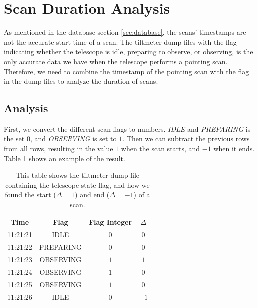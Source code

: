 
\section{Scan Duration Analysis}\label{sec:scan_duration_analysis}
As mentioned in the database section \ref{sec:database}, the scans' timestamps are not the accurate start time of a scan.
The tiltmeter dump files with the flag indicating whether the telescope is idle, preparing to observe, or observing,
is the only accurate data we have when the telescope performs a pointing scan.
Therefore, we need to combine the timestamp of the pointing scan with the flag in the dump files to analyze the duration of scans.

\subsection{Analysis}
First, we convert the different scan flags to numbers.
\textit{IDLE} and \textit{PREPARING} is the set $0$, and \textit{OBSERVING} is set to $1$.
Then we can subtract the previous rows from all rows, resulting in the value $1$ when the scan starts, and $-1$ when it ends.
Table \ref{tab:scan_flag_difference} shows an example of the result.


\begin{table}[H]
    \centering
    \begin{tabular}{cccc}
        \toprule
        Time & Flag & Flag Integer & $\Delta$ \\
        \midrule
        11:21:21 & IDLE & $0$ & $0$ \\
        11:21:22 & PREPARING & $0$ & $0$ \\
        11:21:23 & OBSERVING & $1$ & $1$ \\
        11:21:24 & OBSERVING & $1$ & $0$ \\
        11:21:25 & OBSERVING & $1$ & $0$ \\
        11:21:26 & IDLE & $0$ & $-1$ \\
        \bottomrule
    \end{tabular}
    \caption[Tiltmeter dump file with $\Delta$ for analysis]{This table shows the tiltmeter dump file containing the telescope state flag,
            and how we found the start ($\Delta = 1$) and end ($\Delta = -1$) of a scan.}
    \label{tab:scan_flag_difference}
\end{table}


